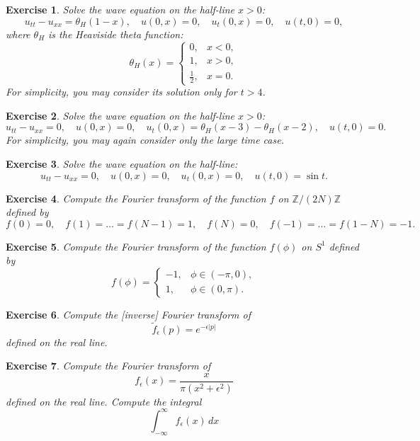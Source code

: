 \documentclass[11pt,a4paper]{article}
\newtheorem*{exercise}{Exercise}
\begin{document}
\begin{exercise}
	Solve the wave equation on the half-line \(x>0\):
	\[
	u_{tt}-u_{xx}=\theta_H(1-x), \quad u(0,x)=0, \quad u_t(0,x)=0, \quad u(t,0)=0,
	\]
	where \(\theta_H\) is the Heaviside theta function:
	\[
	\theta_H(x)=
	\begin{cases}
		0, & x<0,\\
		1, & x>0,\\
		\frac12, & x=0.
	\end{cases}
	\]
	For simplicity, you may consider its solution only for \(t>4\).
\end{exercise}

\begin{exercise}
	Solve the wave equation on the half-line \(x>0\):
	\[
	u_{tt}-u_{xx}=0, \quad u(0,x)=0, \quad u_t(0,x)=\theta_H(x-3)-\theta_H(x-2), \quad u(t,0)=0.
	\]
	For simplicity, you may again consider only the large time case.
\end{exercise}

\begin{exercise}
	Solve the wave equation on the half-line:
	\[
	u_{tt}-u_{xx}=0, \quad u(0,x)=0, \quad u_t(0,x)=0, \quad u(t,0)=\sin t.
	\]
\end{exercise}

\begin{exercise}
	Compute the Fourier transform of the function \(f\) on \(\mathbb{Z}/(2N)\mathbb{Z}\) defined by
	\[
	f(0)=0, \quad f(1)=\ldots =f(N-1)=1, \quad f(N)=0, \quad f(-1)=\ldots =f(1-N)=-1.
	\]
\end{exercise}

\begin{exercise}
	Compute the Fourier transform of the function \(f(\phi)\) on \(S^1\) defined by
	\[
	f(\phi)=
	\begin{cases}
		-1, & \phi\in(-\pi,0),\\
		1, & \phi\in(0,\pi).
	\end{cases}
	\]
\end{exercise}

\begin{exercise}
	Compute the [inverse] Fourier transform of
	\[
	\tilde{f}_{\epsilon}(p)=e^{-\epsilon|p|}
	\]
	defined on the real line.
\end{exercise}

\begin{exercise}
	Compute the Fourier transform of
	\[
	f_{\epsilon}(x)=\frac{x}{\pi(x^2+\epsilon^2)}
	\]
	defined on the real line.
	Compute the integral
	\[
	\int_{-\infty}^{\infty}f_{\epsilon}(x)\,dx
	\]
\end{exercise}
\end{document}
